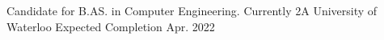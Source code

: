 

\begin{cventries}

  \cventry
    {Candidate for B.AS. in Computer Engineering. Currently 2A} %
    {University of Waterloo} %
    {} %
    {Expected Completion Apr. 2022} %
    {}

\end{cventries}
